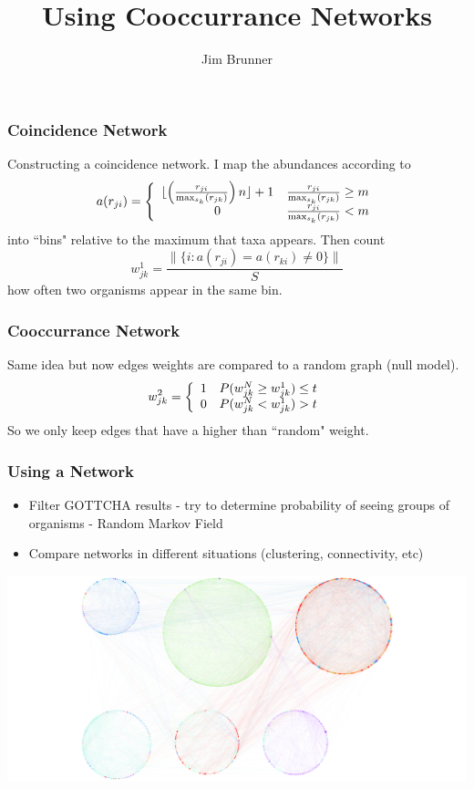 \documentclass{beamer}
\author[Brunner]{Jim Brunner}
\institute[LANL]{Los Alamos National Laboratory}
\title{Using Cooccurrance Networks}
\date{}
\begin{document}
\begin{frame}
\titlepage
\end{frame}
\begin{frame}
\frametitle{Coincidence Network}
Constructing a coincidence network.
I map the abundances according to
\[
a(r_{ji})  = \left\{
\begin{array}{c c}
\lfloor\left(\frac{r_{ji}}{\max_{s_k}(r_{jk})}\right) n \rfloor + 1 &  \frac{r_{ji}}{\max_{s_k}(r_{jk})} \geq m \\
0 & \frac{r_{ji}}{\max_{s_k}(r_{jk})} < m
\end{array}
\right.
\]
into ``bins" relative to the maximum that taxa appears. Then count 
\[
w^1_{jk} = \frac{\|\{i: a(r_{ji}) = a(r_{ki}) \neq 0\} \|}{S}
\]
how often two organisms appear in the same bin.
\end{frame}
\begin{frame}
\frametitle{Cooccurrance Network}
Same idea but now edges weights are compared to a random graph (null model). 
\[
w_{jk}^2 = \left\{ \begin{array}{c c}
1 & P(w_{jk}^N \geq w_{jk}^1) \leq t\\
0 & P(w_{jk}^N < w_{jk}^1) > t
\end{array}\right.
\]
So we only keep edges that have a higher than ``random" weight.
\end{frame}
\begin{frame}
\frametitle{Using a Network}
\begin{itemize}
	\item Filter GOTTCHA results - try to determine probability of seeing groups of organisms - Random Markov Field
	\item Compare networks in different situations (clustering, connectivity, etc)
\end{itemize}
\includegraphics[scale = 0.2]{june20/june20_species.png}

\end{frame}
\end{document}
